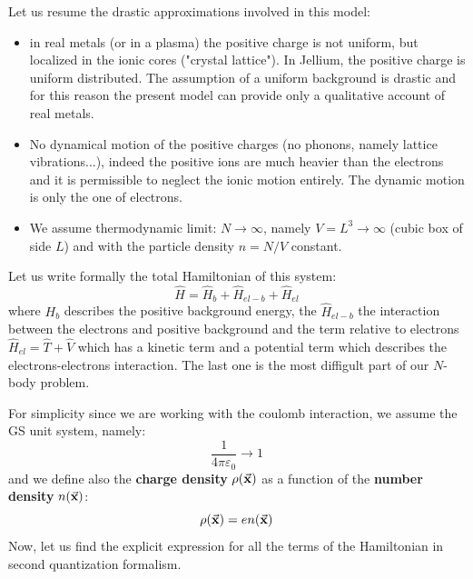 \documentclass[../main/main.tex]{subfiles}
\begin{document}
Let us resume the drastic approximations involved in this model: 
\begin{itemize}
\item in real metals (or in a plasma) the positive charge is not uniform, but localized in the ionic cores ("crystal lattice"). In Jellium, the positive charge is uniform distributed. The assumption of a uniform background is drastic and for this reason the present model can provide only a qualitative account of real metals.
\item No dynamical motion of the positive charges (no phonons, namely lattice vibrations...), indeed the positive ions are much heavier than the electrons and it is permissible to neglect the ionic motion entirely. The dynamic motion is only the one of electrons.
\item We assume thermodynamic limit: \( N \rightarrow \infty  \), namely \( V = L^3 \rightarrow \infty  \) (cubic box of side \( L \)) and with the particle density \( n=N/V \) constant.
\end{itemize}

Let us write formally the total Hamiltonian of this system:
\begin{equation}
  \hat{H} = \hat{H}_b + \hat{H}_{el-b} + \hat{H}_{el}
\end{equation}
where \( H_b \) describes the positive background energy, the \( \hat{H}_{el-b} \) the interaction between the electrons and positive background and the term relative to electrons \( \hat{H}_{el} = \hat{T} + \hat{V}  \) which has a kinetic term and a potential term which describes the electrons-electrons interaction.  The last one is the most
diffigult part of our \( N\)-body problem.

For simplicity since we are working with the coulomb interaction, we assume the GS unit system, namely:
\begin{equation*}
  \frac{1}{4 \pi \varepsilon _0} \rightarrow 1
\end{equation*}
and we define also the \textbf{charge density} \( \rho (\va{x}) \) as a function of the \textbf{number density} \( n(\va{x}) \):  
\begin{equation}
  \rho (\va{x}) = e n (\va{x})
\end{equation}
Now, let us find the explicit expression for all the terms of the Hamiltonian in second quantization formalism.
\end{document}
